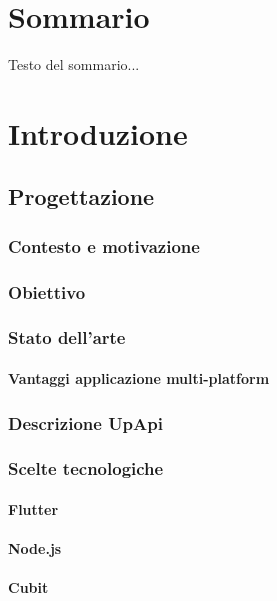 \documentclass[12pt]{article}
\begin{document}
\section*{Sommario}

Testo del sommario...

\newpage

\tableofcontents

\newpage



\section{Introduzione}

\subsection{Progettazione}

\subsubsection{Contesto e motivazione}
\subsubsection{Obiettivo}
\subsubsection{Stato dell’arte}
\paragraph{Vantaggi applicazione multi-platform}

\subsubsection{Descrizione UpApi}
\subsubsection{Scelte tecnologiche}
\paragraph{Flutter}
\paragraph{Node.js}
\paragraph{Cubit}
\end{document}
